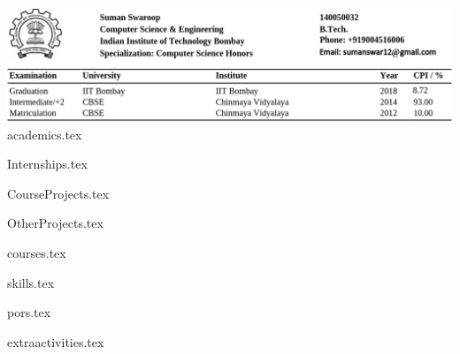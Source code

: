 \documentclass[11pt, a4paper]{awesome-cv}
\newcommand*{\sectiondir}{resume/}
\begin{document}
\includegraphics[scale=0.46]{topresumee}
\vspace*{-0.4cm}
{academics.tex}

\vspace*{-0.54cm}
{Internships.tex}

\vspace*{-0.54cm}
{CourseProjects.tex}

\vspace*{-0.54cm}
{OtherProjects.tex}


\vspace*{-0.54cm}
{courses.tex}

\vspace*{-0.54cm}
{skills.tex}

\vspace*{-0.54cm}
{pors.tex}

\vspace*{-0.54cm}
{extraactivities.tex}







\end{document}
